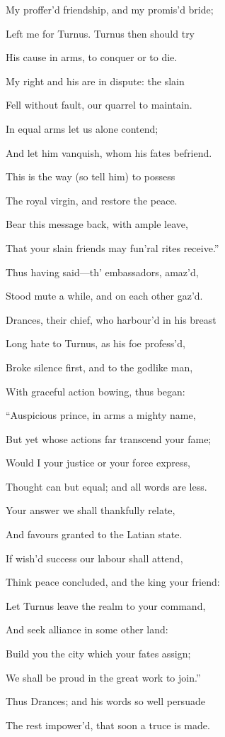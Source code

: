 My proffer’d friendship, and my promis’d bride;

Left me for Turnus. Turnus then should try

His cause in arms, to conquer or to die.

My right and his are in dispute: the slain

Fell without fault, our quarrel to maintain.

In equal arms let us alone contend;

And let him vanquish, whom his fates befriend.

This is the way (so tell him) to possess

The royal virgin, and restore the peace.

Bear this message back, with ample leave,

That your slain friends may fun’ral rites receive.”

Thus having said—th’ embassadors, amaz’d,

Stood mute a while, and on each other gaz’d.

Drances, their chief, who harbour’d in his breast

Long hate to Turnus, as his foe profess’d,

Broke silence first, and to the godlike man,

With graceful action bowing, thus began:

“Auspicious prince, in arms a mighty name,

But yet whose actions far transcend your fame;

Would I your justice or your force express,

Thought can but equal; and all words are less.

Your answer we shall thankfully relate,

And favours granted to the Latian state.

If wish’d success our labour shall attend,

Think peace concluded, and the king your friend:

Let Turnus leave the realm to your command,

And seek alliance in some other land:

Build you the city which your fates assign;

We shall be proud in the great work to join.”

Thus Drances; and his words so well persuade

The rest impower’d, that soon a truce is made.

